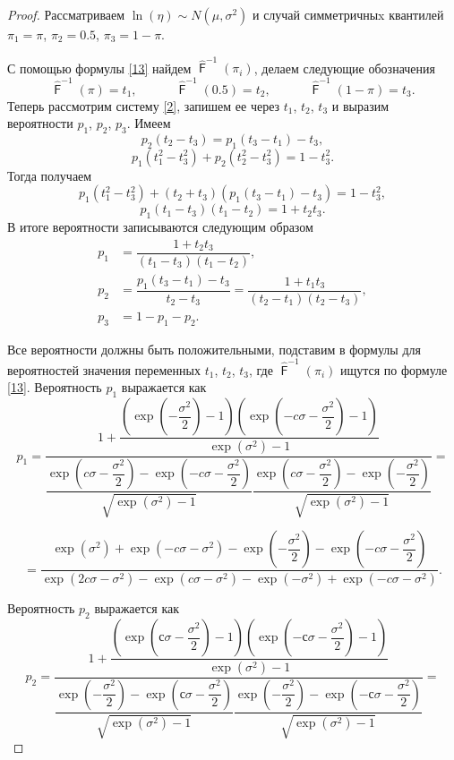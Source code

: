 \documentclass[specialist, substylefile = spbu.rtx,
subf,href,colorlinks=true, 12pt]{disser}
\DeclareMathOperator{\F}{\mathsf{F}}
\begin{document}
	\begin{proof}
		Рассматриваем $\ln(\eta) \sim N(\mu, \sigma^{2})$ и случай симметричныx квантилей $\pi_{1} = \pi$, $\pi_{2} = 0.5$, $\pi_{3} = 1-\pi$.
		
		С помощью формулы \eqref{13} найдем $\displaystyle{\hat{\F}^{-1}(\pi_{i})}$, делаем следующие обозначения
		\[\hat{\F}^{-1}(\pi) = t_{1}, \quad\quad\quad \hat{\F}^{-1}(0.5) = t_{2}, \quad\quad\quad \hat{\F}^{-1}(1-\pi) = t_{3}.\]
		Теперь рассмотрим систему \eqref{2}, запишем ее через $t_{1}$, $t_{2}$, $t_{3}$ и выразим вероятности $p_{1}$, $p_{2}$, $p_{3}$. Имеем 
		\[p_{2}(t_{2}-t_{3})=p_{1}(t_{3}-t_{1})-t_{3},\]
		\[p_{1}(t_{1}^{2}-t_{3}^{2}) + p_{2}(t_{2}^{2} - t_{3}^{2})=1-t_{3}^{2}.\]
		Тогда получаем
		\[p_{1}(t_{1}^{2}-t_{3}^{2}) + (t_{2}+t_{3})(p_{1}(t_{3}-t_{1})-t_{3})=1-t_{3}^{2},\]
		\[p_{1}(t_{1}-t_{3})(t_{1}-t_{2})=1+t_{2}t_{3}.\]
		В итоге вероятности записываются следующим образом 
		\begin{align}
			p_{1} &= \dfrac{1+t_{2}t_{3}}{(t_{1}-t_{3})(t_{1}-t_{2})}, \label{15}\\
			p_{2} &= \dfrac{p_{1}(t_{3}-t_{1})-t_{3}}{t_{2}-t_{3}}=\dfrac{1+t_{1}t_{3}}{(t_{2}-t_{1})(t_{2}-t_{3})}, \label{16}\\
			p_{3} &= 1-p_{1}-p_{2}.
		\end{align}
		
		Все вероятности должны быть положительными, подставим в формулы для вероятностей значения переменных $t_{1}$, $t_{2}$, $t_{3}$, где $\hat{\F}^{-1}(\pi_{i})$ ищутся по формуле \eqref{13}. Вероятность $p_{1}$ выражается как
		\[p_{1}=\dfrac{1+\dfrac{\left( \exp\left( -\dfrac{\sigma^{2}}{2}\right) -1\right) \left( \exp\left(-c\sigma-\dfrac{\sigma^{2}}{2}\right) -1\right) }{\exp(\sigma^{2})-1}}{\dfrac{\exp\left(c\sigma-\dfrac{\sigma^{2}}{2}\right) -\exp\left( -c\sigma-\dfrac{\sigma^{2}}{2}\right) }{\sqrt{\exp(\sigma^{2})-1}}\dfrac{\exp\left( c\sigma-\dfrac{\sigma^{2}}{2}\right) -\exp\left( -\dfrac{\sigma^{2}}{2}\right) }{\sqrt{\exp(\sigma^{2})-1}}}=\]
		
		\[=\dfrac{\exp(\sigma^{2})+\exp(-c\sigma-\sigma^{2})-\exp\left( -\dfrac{\sigma^{2}}{2}\right) -\exp\left( -c\sigma-\dfrac{\sigma^{2}}{2}\right) }{\exp(2c\sigma-\sigma^{2})-\exp(c\sigma-\sigma^{2})-\exp(-\sigma^{2})+\exp(-c\sigma-\sigma^{2})}.\]
		
		Вероятность $p_{2}$ выражается как
		\[p_{2}=\dfrac{1+\dfrac{\left( \exp\left( с\sigma-\dfrac{\sigma^{2}}{2}\right) -1\right) \left( \exp\left( -с\sigma-\dfrac{\sigma^{2}}{2}\right) -1\right) }{\exp(\sigma^{2})-1}}{\dfrac{\exp\left( -\dfrac{\sigma^{2}}{2}\right) -\exp\left( с\sigma-\dfrac{\sigma^{2}}{2}\right) }{\sqrt{\exp(\sigma^{2})-1}}\dfrac{\exp\left( -\dfrac{\sigma^{2}}{2}\right) -\exp\left( -с\sigma-\dfrac{\sigma^{2}}{2}\right) }{\sqrt{\exp(\sigma^{2})-1}}}=\]
		

\end{proof}
\end{document}
